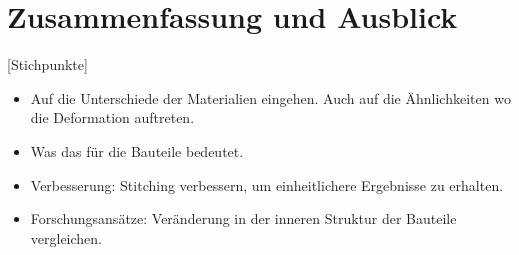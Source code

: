 
\chapter{Zusammenfassung und Ausblick}

[Stichpunkte]

\begin{itemize}
    \item Auf die Unterschiede der Materialien eingehen. Auch auf die Ähnlichkeiten 
    wo die Deformation auftreten.
    \item Was das für die Bauteile bedeutet.
    \item Verbesserung: Stitching verbessern, um einheitlichere Ergebnisse zu erhalten.
    \item Forschungsansätze: Veränderung in der inneren Struktur der Bauteile 
    vergleichen.
\end{itemize}
